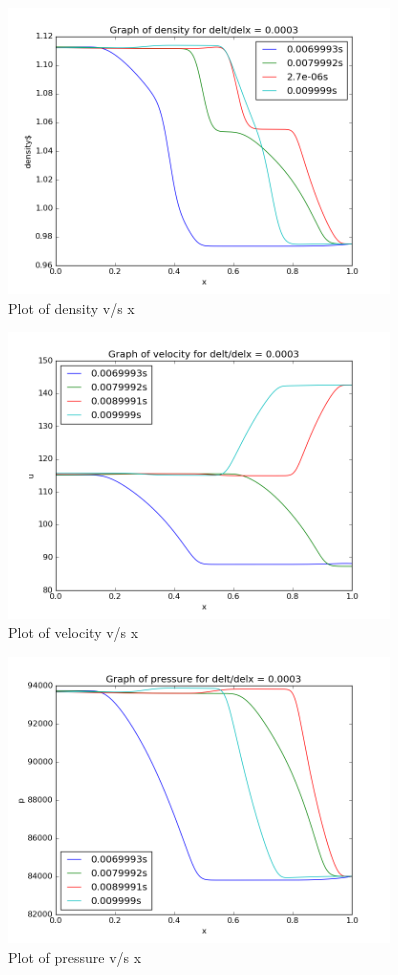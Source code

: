 \documentclass[11pt, a4paper]{article}
\begin{document}
\begin{figure}[H]
 \centering
 \includegraphics[width = 0.9\textwidth]{FTCS2_2_3.png}
 \caption{Plot of density v/s x}
\end{figure}
\begin{figure}[H]
 \centering
 \includegraphics[width = 0.9\textwidth]{FTCS2_2_6.png}
 \caption{Plot of velocity v/s x}
\end{figure}
\begin{figure}[H]
 \centering
 \includegraphics[width = 0.9\textwidth]{FTCS2_2_9.png}
 \caption{Plot of pressure v/s x}
\end{figure}
\end{document}

